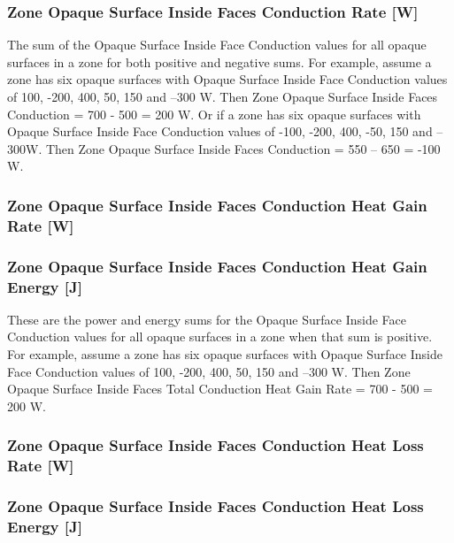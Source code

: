 \subsubsection{Zone Opaque Surface Inside Faces Conduction Rate {[}W{]}}\label{zone-opaque-surface-inside-face-conduction-w}

The sum of the Opaque Surface Inside Face Conduction values for all opaque surfaces in a zone for both positive and negative sums. For example, assume a zone has six opaque surfaces with Opaque Surface Inside Face Conduction values of 100, -200, 400, 50, 150 and --300 W. Then Zone Opaque Surface Inside Faces Conduction = 700 - 500 = 200 W. Or if a zone has six opaque surfaces with Opaque Surface Inside Face Conduction values of -100, -200, 400, -50, 150 and --300W. Then Zone Opaque Surface Inside Faces Conduction = 550 -- 650 = -100 W.

\subsubsection{Zone Opaque Surface Inside Faces Conduction Heat Gain Rate {[}W{]}}\label{zone-opaque-surface-inside-faces-conduction-heat-gain-rate-w}

\subsubsection{Zone Opaque Surface Inside Faces Conduction Heat Gain Energy {[}J{]}}\label{zone-opaque-surface-inside-faces-conduction-heat-gain-energy-j}

These are the power and energy sums for the Opaque Surface Inside Face Conduction values for all opaque surfaces in a zone when that sum is positive. For example, assume a zone has six opaque surfaces with Opaque Surface Inside Face Conduction values of 100, -200, 400, 50, 150 and --300 W. Then Zone Opaque Surface Inside Faces Total Conduction Heat Gain Rate = 700 - 500 = 200 W.

\subsubsection{Zone Opaque Surface Inside Faces Conduction Heat Loss Rate {[}W{]}}\label{zone-opaque-surface-inside-faces-conduction-heat-loss-rate-w}

\subsubsection{Zone Opaque Surface Inside Faces Conduction Heat Loss Energy {[}J{]}}\label{zone-opaque-surface-inside-faces-conduction-heat-loss-energy-j}

